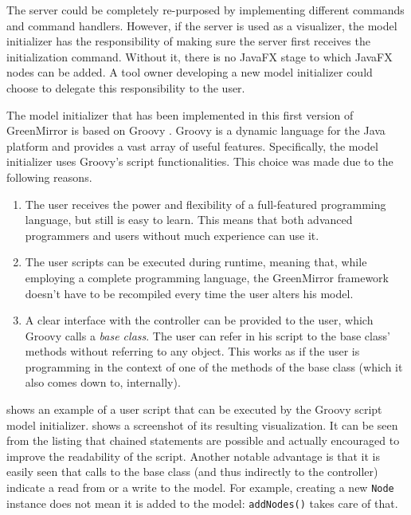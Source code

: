 \par The server could be completely re-purposed by implementing different commands and command handlers. However, if the server is used as a visualizer, the model initializer has the responsibility of making sure the server first receives the initialization command. Without it, there is no JavaFX stage to which JavaFX nodes can be added. A tool owner developing a new model initializer could choose to delegate this responsibility to the user.
\par The model initializer that has been implemented in this first version of GreenMirror is based on Groovy \cite{groovy}. Groovy is a dynamic language for the Java platform and provides a vast array of useful features. Specifically, the model initializer uses Groovy's script functionalities. This choice was made due to the following reasons.
\begin{enumerate}
\item The user receives the power and flexibility of a full-featured programming language, but still is easy to learn. This means that both advanced programmers and users without much experience can use it.
\item The user scripts can be executed during runtime, meaning that, while employing a complete programming language, the GreenMirror framework doesn't have to be recompiled every time the user alters his model.
\item A clear interface with the controller can be provided to the user, which Groovy calls a \emph{base class}. The user can refer in his script to the base class' methods without referring to any object. This works as if the user is programming in the context of one of the methods of the base class (which it also comes down to, internally).
\end{enumerate}
 shows an example of a user script that can be executed by the Groovy script model initializer.  shows a screenshot of its resulting visualization. It can be seen from the listing that chained statements are possible and actually encouraged to improve the readability of the script. Another notable advantage is that it is easily seen that calls to the base class (and thus indirectly to the controller) indicate a read from or a write to the model. For example, creating a new \lstinline{Node} instance does not mean it is added to the model: \lstinline{addNodes()} takes care of that.

